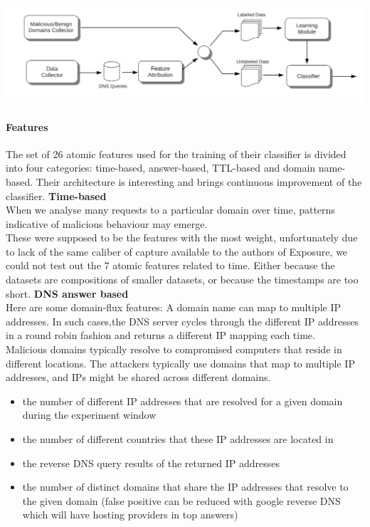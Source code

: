 \includegraphics[scale=.8]{img/exposure_architecture.png}

\paragraph{Features}
The set of 26 atomic features used for the training of their classifier is divided into four categories: time-based, answer-based, TTL-based and domain name-based. Their architecture is interesting and brings continuous improvement of the classifier.
\textbf{Time-based}\\
When we analyse many requests to a particular domain over time, patterns indicative of malicious behaviour may emerge.\\
These were supposed to be the features with the most weight, unfortunately due to lack of the same caliber of capture available to the authors of Exposure, we could not test out the 7 atomic features related to time. Either because the datasets are compositions of smaller datasets, or because the timestamps are too short.
\textbf{DNS answer based}\\
Here are some domain-flux features: A domain name can map to multiple IP addresses. In such cases,the DNS server cycles through the different IP addresses in a round robin fashion and returns a different IP mapping each time. \\
Malicious domains typically resolve to compromised computers that reside in different locations. The attackers typically use domains that map to multiple IP addresses, and IPs might be shared across different domains.
\begin{itemize}[noitemsep]
\item the number of different IP addresses that are resolved for a given domain during the experiment window
\item the number of different countries that these IP addresses are located in
\item the reverse DNS query results of the returned IP addresses
\item the number of distinct domains that share the IP addresses that resolve to the given domain (false positive can be reduced with google reverse DNS which will have hosting providers in top answers)
\end{itemize}
